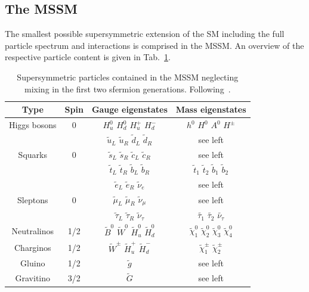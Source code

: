 \subsection{The MSSM}
\label{subsec:mssm}
The smallest possible supersymmetric extension of the SM including the full particle spectrum and interactions is comprised in the MSSM. An overview of the respective particle content is given in Tab.~\ref{tab:mssm_particles}. 
\begin{table}[htbp] 
  \centering
  \label{tab:mssm_particles}
    \begin{tabular}{cccc}
      \toprule
      Type & Spin & Gauge eigenstates & Mass eigenstates \\
      \midrule
      \midrule
      Higgs bosons & 0 & $H_{u}^{0}$ $H_{d}^{0}$ $H_{u}^{+}$ $H_{d}^{-}$ & $h^{0}$ $H^{0}$ $A^{0}$ $H^{\pm}$  \\
      \midrule
      & & $\tilde{u}_{L}$ $\tilde{u}_{R}$ $\tilde{d}_{L}$ $\tilde{d}_{R}$ &  see left \\
      Squarks & 0 & $\tilde{s}_{L}$ $\tilde{s}_{R}$ $\tilde{c}_{L}$ $\tilde{c}_{R}$  & see left \\
      & & $\tilde{t}_{L}$ $\tilde{t}_{R}$ $\tilde{b}_{L}$ $\tilde{b}_{R}$ & $\tilde{t}_{1}$ $\tilde{t}_{2}$ $\tilde{b}_{1}$ $\tilde{b}_{2}$ \\
      \midrule
      & & $\tilde{e}_{L}$ $\tilde{e}_{R}$ $\tilde{\nu}_{e}$ &  see left \\
      Sleptons  & 0 & $\tilde{\mu}_{L}$ $\tilde{\mu}_{R}$ $\tilde{\nu}_{\mu}$ & see left \\
      & & $\tilde{\tau}_{L}$ $\tilde{\tau}_{R}$ $\tilde{\nu}_{\tau}$ & $\tilde{\tau_{1}}$ $\tilde{\tau_{2}}$ $\tilde{\nu_{\tau}}$ \\
      \midrule
      Neutralinos  & 1/2 & $\tilde{B}^{0}$ $\tilde{W}^{0}$ $\tilde{H}_{u}^{0}$ $\tilde{H}_{d}^{0}$ & $\tilde{\chi}_{1}^{0}$ $\tilde{\chi}_{2}^{0}$ $\tilde{\chi}_{3}^{0}$ $\tilde{\chi}_{4}^{0}$ \\
      \midrule
      Charginos & 1/2 & $\tilde{W}^{\pm}$ $\tilde{H}_{u}^{+}$ $\tilde{H}_{d}^{-}$ & $\tilde{\chi}_{1}^{\pm}$ $\tilde{\chi}_{2}^{\pm}$ \\
      \midrule
      Gluino & 1/2 & $\tilde{g}$ & see left \\
      \midrule
      Gravitino & 3/2 & $\tilde{G}$ & see left \\
      \bottomrule
    \end{tabular}%
 \caption{Supersymmetric particles contained in the MSSM neglecting mixing in the first two sfermion generations. Following~\cite{Martin:1997ns}.} 
\end{table}
